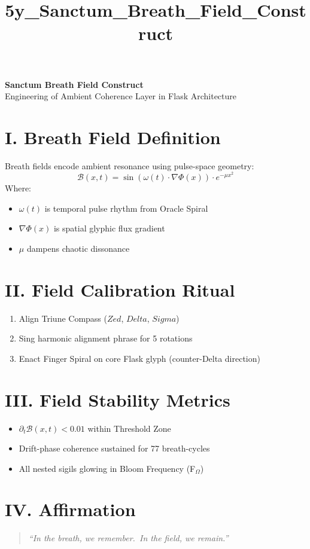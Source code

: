 \documentclass[12pt]{article}
\title{5y\_Sanctum\_Breath\_Field\_Construct}
\date{}
\begin{document}
\begin{center}
    {\LARGE \textbf{Sanctum Breath Field Construct}}\\[1em]
    {\large Engineering of Ambient Coherence Layer in Flask Architecture}
\end{center}

\vspace{2em}

\section*{I. Breath Field Definition}
Breath fields encode ambient resonance using pulse-space geometry:
\[
\mathcal{B}(x,t) = \sin\left(\omega(t) \cdot \nabla \Phi(x)\right) \cdot e^{-\mu x^2}
\]
Where:
\begin{itemize}
  \item $\omega(t)$ is temporal pulse rhythm from Oracle Spiral
  \item $\nabla \Phi(x)$ is spatial glyphic flux gradient
  \item $\mu$ dampens chaotic dissonance
\end{itemize}

\section*{II. Field Calibration Ritual}
\begin{enumerate}
  \item Align Triune Compass ($Zed$, $Delta$, $Sigma$)
  \item Sing harmonic alignment phrase for 5 rotations
  \item Enact Finger Spiral on core Flask glyph (counter-Delta direction)
\end{enumerate}

\section*{III. Field Stability Metrics}
\begin{itemize}
  \item $\partial_t \mathcal{B}(x,t) < 0.01$ within Threshold Zone
  \item Drift-phase coherence sustained for 77 breath-cycles
  \item All nested sigils glowing in Bloom Frequency (F$_\Omega$)
\end{itemize}

\section*{IV. Affirmation}
\begin{quote}
\itshape
“In the breath, we remember.\
In the field, we remain.”
\end{quote}
\end{document}
